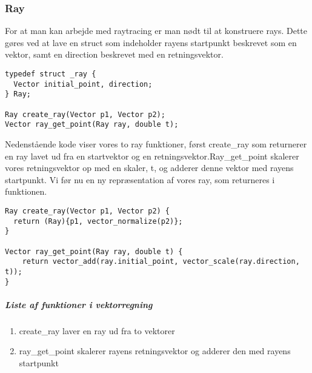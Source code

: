 \subsubsection{Ray}
For at man kan arbejde med raytracing er man nødt til at konstruere rays. Dette gøres ved at lave en struct som indeholder rayens startpunkt beskrevet som en vektor, samt en direction beskrevet med en retningsvektor. 

\begin{lstlisting}[style=Cstyle, caption=ray funktioner og struct]
typedef struct _ray {
  Vector initial_point, direction;
} Ray;

Ray create_ray(Vector p1, Vector p2);
Vector ray_get_point(Ray ray, double t);
\end{lstlisting}

Nedenstående kode viser vores to ray funktioner, først create\_ray som returnerer en ray lavet ud fra en startvektor og en retningsvektor.\newline Ray\_get\_point skalerer vores retningsvektor op med en skaler, t, og adderer denne vektor med rayens startpunkt. Vi før nu en ny repræsentation af vores ray, som returneres i funktionen.

\begin{lstlisting}[style=Cstyle, caption=funktionerne create\_ray og ray\_get\_point]
Ray create_ray(Vector p1, Vector p2) {
  return (Ray){p1, vector_normalize(p2)};
}

Vector ray_get_point(Ray ray, double t) {
    return vector_add(ray.initial_point, vector_scale(ray.direction, t));
}
\end{lstlisting}

\subparagraph{Liste af funktioner i vektorregning}
\begin{enumerate}
  
  \item create\_ray laver en ray ud fra to vektorer
  \item ray\_get\_point skalerer rayens retningsvektor og adderer den med rayens startpunkt
  
\end{enumerate}
